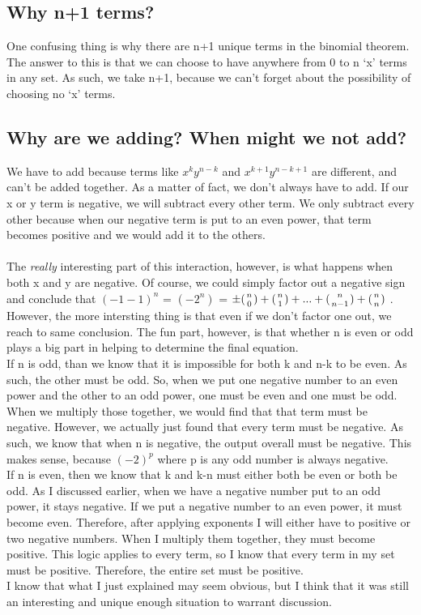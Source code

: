 \documentclass[11pt]{article} %
\newcommand\tab[1][1cm]{\hspace*{#1}}
\begin{document}
\subsection*{Why n+1 terms?}
\tab One confusing thing is why there are n+1 unique terms in the binomial theorem. The answer to this is that we can choose to have anywhere from 0 to n `x' terms in any set. As such, we take n+1, because we can't forget about the possibility of choosing no `x' terms. 

\subsection*{Why are we adding? When might we not add?}
\tab We have to add because terms like $x^{k} y^{n-k}$ and $x^{k+1} y^{n-k+1}$ are different, and can't be added together. As a matter of fact, we don't always have to add. If our x or y term is negative, we will subtract every other term. We only subtract every other because when our negative term is put to an even power, that term becomes positive and we would add it to the others.
\\
\\ \tab The \textit{really} interesting part of this interaction, however, is what happens when both x and y are negative. Of course, we could simply factor out a negative sign and conclude that $(-1-1)^n$ = $(-2^n)$ = $\pm({n\atop 0})+ ({n\atop 1}) + ... + ({n\atop n-1}) + ({n\atop n})$ . However, the more intersting thing is that even if we don't factor one out, we reach to same conclusion. The fun part, however, is that whether n is even or odd plays a big part in helping to determine the final equation. 
\\ \tab If n is odd, than we know that it is impossible for both k and n-k to be even. As such, the other must be odd. So, when we put one negative number to an even power and the other to an odd power, one must be even and one must be odd. When we multiply those together, we would find that that term must be negative. However, we actually just found that every term must be negative.  As such, we know that when n is negative, the output overall must be negative. This makes sense, because $(-2)^{p}$ where p is any odd number is always negative. 
\\ \tab If n is even, then we know that k and k-n must either both be even or both be odd. As I discussed earlier, when we have a negative number put to an odd power, it stays negative. If we put a negative number to an even power, it must become even. Therefore, after applying exponents I will either have to positive or two negative numbers. When I multiply them together, they must become positive. This logic applies to every term, so I know that every term in my set must be positive. Therefore, the entire set must be positive. 
\\ \tab I know that what I just explained may seem obvious, but I think that it was still an interesting and unique enough situation to warrant discussion.
\end{document}
